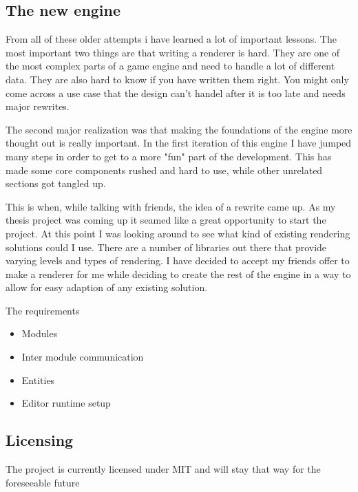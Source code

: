 \subsection{The new engine}

From all of these older attempts i have learned a lot of important lessons. The most important two things are that writing a renderer is hard. They are one of the most complex parts of a game engine and need to handle a lot of different data. They are also hard to know if you have written them right. You might only come across a use case that the design can't handel after it is too late and needs major rewrites.

The second major realization was that making the foundations of the engine more thought out is really important. In the first iteration of this engine I have jumped many steps in order to get to a more "fun" part of the development. This has made some core components rushed and hard to use, while other unrelated sections got tangled up.

This is when, while talking with friends, the idea of a rewrite came up. As my thesis project was coming up it seamed like a great opportunity to start the project. At this point I was looking around to see what kind of existing rendering solutions could I use. There are a number of libraries out there that provide varying levels and types of rendering. I have decided to accept my friends offer to make a renderer for me while deciding to create the rest of the engine in a way to allow for easy adaption of any existing solution.

The requirements
\begin{itemize}
    \item Modules
    \item Inter module communication
    \item Entities
    \item Editor runtime setup
\end{itemize}

\subsection{Licensing}

The project is currently licensed under MIT and will stay that way for the foreseeable future
